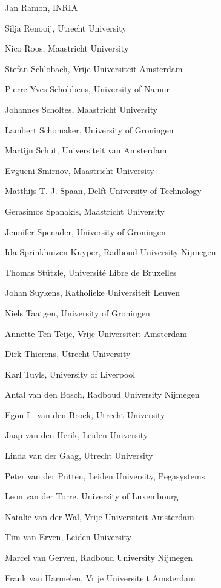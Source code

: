 \documentclass[a4paper,oneside]{book}
\begin{document}
\begin{compactitem}[]
		\item[] Jan Ramon, INRIA
		\item[] Silja Renooij, Utrecht University
		\item[] Nico Roos, Maastricht University
		\item[] Stefan Schlobach, Vrije Universiteit Amsterdam
		\item[] Pierre-Yves Schobbens, University of Namur
		\item[] Johannes Scholtes, Maastricht University
		\item[] Lambert Schomaker, University of Groningen
		\item[] Martijn Schut, Universiteit van Amsterdam
		\item[] Evgueni Smirnov, Maastricht University
		\item[] Matthijs T. J. Spaan, Delft University of Technology
		\item[] Gerasimos Spanakis, Maastricht University
		\item[] Jennifer Spenader, University of Groningen
		\item[] Ida Sprinkhuizen-Kuyper, Radboud University Nijmegen
		\item[] Thomas Stützle, Universit\'e Libre de Bruxelles
		\item[] Johan Suykens, Katholieke Universiteit Leuven
		\item[] Niels Taatgen, University of Groningen
		\item[] Annette Ten Teije, Vrije Universiteit Amsterdam
		\item[] Dirk Thierens, Utrecht University
		\item[] Karl Tuyls, University of Liverpool
		\item[] Antal van den Bosch, Radboud University Nijmegen
		\item[] Egon L. van den Broek, Utrecht University
		\item[] Jaap van den Herik, Leiden University
		\item[] Linda van der Gaag, Utrecht University
		\item[] Peter van der Putten, Leiden University, Pegasystems
		\item[] Leon van der Torre, University of Luxembourg
		\item[] Natalie van der Wal, Vrije Universiteit Amsterdam
		\item[] Tim van Erven, Leiden University
		\item[] Marcel van Gerven, Radboud University Nijmegen
		\item[] Frank van Harmelen, Vrije Universiteit Amsterdam

\end{compactitem}
\end{document}
